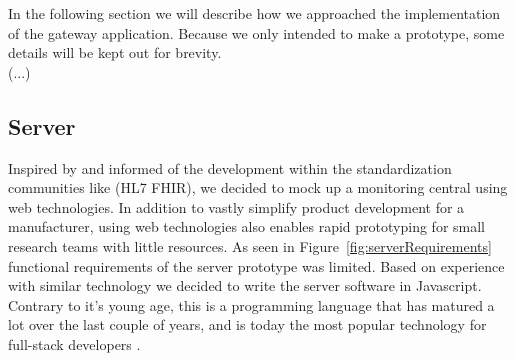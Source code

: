 In the following section we will describe how we approached the implementation of the gateway application. Because we only intended to make a prototype, some details will be kept out for brevity. 
\\
\newline
(...)






\subsection{Server} %
\label{sub:server}

Inspired by \cite{Thelen:2014ew} and informed of the development within the standardization communities like (HL7 FHIR), we decided to mock up a monitoring central using web technologies. In addition to vastly simplify product development for a manufacturer, using web technologies also enables rapid prototyping for small research teams with little resources. As seen in Figure~\ref{fig:serverRequirements} functional requirements of the server prototype was limited. Based on experience with similar technology we decided to write the server software in Javascript. Contrary to it's young age, this is a programming language that has matured a lot over the last couple of years, and is today the most popular technology for full-stack developers \cite{so:survey:results}.

